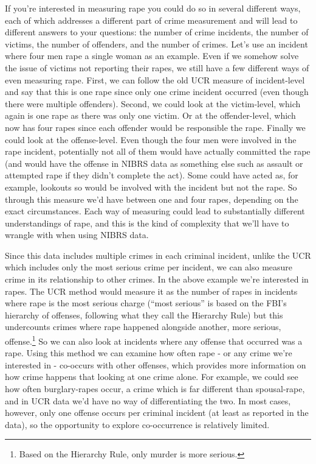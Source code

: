 \documentclass[
  12pt,
  openany]{book}
\begin{document}
If you're interested in measuring rape you could do so in several different ways, each of which addresses a different part of crime measurement and will lead to different answers to your questions: the number of crime incidents, the number of victims, the number of offenders, and the number of crimes. Let's use an incident where four men rape a single woman as an example. Even if we somehow solve the issue of victims not reporting their rapes, we still have a few different ways of even measuring rape. First, we can follow the old UCR measure of incident-level and say that this is one rape since only one crime incident occurred (even though there were multiple offenders). Second, we could look at the victim-level, which again is one rape as there was only one victim. Or at the offender-level, which now has four rapes since each offender would be responsible the rape. Finally we could look at the offense-level. Even though the four men were involved in the rape incident, potentially not all of them would have actually committed the rape (and would have the offense in NIBRS data as something else such as assault or attempted rape if they didn't complete the act). Some could have acted as, for example, lookouts so would be involved with the incident but not the rape. So through this measure we'd have between one and four rapes, depending on the exact circumstances. Each way of measuring could lead to substantially different understandings of rape, and this is the kind of complexity that we'll have to wrangle with when using NIBRS data.

Since this data includes multiple crimes in each criminal incident, unlike the UCR which includes only the most serious crime per incident, we can also measure crime in its relationship to other crimes. In the above example we're interested in rapes. The UCR method would measure it as the number of rapes in incidents where rape is the most serious charge (``most serious'' is based on the FBI's hierarchy of offenses, following what they call the Hierarchy Rule) but this undercounts crimes where rape happened alongside another, more serious, offense.\footnote{Based on the Hierarchy Rule, only murder is more serious.} So we can also look at incidents where any offense that occurred was a rape. Using this method we can examine how often rape - or any crime we're interested in - co-occurs with other offenses, which provides more information on how crime happens that looking at one crime alone. For example, we could see how often burglary-rapes occur, a crime which is far different than spousal-rape, and in UCR data we'd have no way of differentiating the two. In most cases, however, only one offense occurs per criminal incident (at least as reported in the data), so the opportunity to explore co-occurrence is relatively limited.
\end{document}
